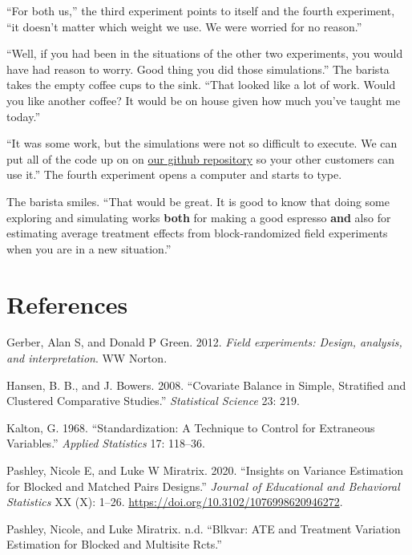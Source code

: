\documentclass[
]{article}
\newlength{\cslhangindent}
\newenvironment{cslreferences}%
  {\setlength{\parindent}{0pt}%
  \everypar{\setlength{\hangindent}{\cslhangindent}}\ignorespaces}%
  {\par}
\begin{document}
``For both us,'' the third experiment points to itself and the fourth experiment, ``it doesn't matter which weight we use. We were worried for no reason.''

``Well, if you had been in the situations of the other two experiments, you would have had reason to worry. Good thing you did those simulations.'' The barista takes the empty coffee cups to the sink. ``That looked like a lot of work. Would you like another coffee? It would be on house given how much you've taught me today.''

``It was some work, but the simulations were not so difficult to execute. We can put all of the code up on on \href{https://github.com/egap/standards_discussions/block_rand}{our github repository} so your other customers can use it.'' The fourth experiment opens a computer and starts to type.

The barista smiles. ``That would be great. It is good to know that doing some exploring and simulating works \textbf{both} for making a good espresso \textbf{and} also for estimating average treatment effects from block-randomized field experiments when you are in a new situation.''

\hypertarget{references}{%
\section*{References}\label{references}}

\hypertarget{refs}{}
\begin{cslreferences}
\leavevmode\hypertarget{ref-gerber2012field}{}%
Gerber, Alan S, and Donald P Green. 2012. \emph{Field experiments: Design, analysis, and interpretation}. WW Norton.

\leavevmode\hypertarget{ref-hansen2008cbs}{}%
Hansen, B. B., and J. Bowers. 2008. ``Covariate Balance in Simple, Stratified and Clustered Comparative Studies.'' \emph{Statistical Science} 23: 219.

\leavevmode\hypertarget{ref-kalton1968}{}%
Kalton, G. 1968. ``Standardization: A Technique to Control for Extraneous Variables.'' \emph{Applied Statistics} 17: 118--36.

\leavevmode\hypertarget{ref-pashley2020blocked}{}%
Pashley, Nicole E, and Luke W Miratrix. 2020. ``Insights on Variance Estimation for Blocked and Matched Pairs Designs.'' \emph{Journal of Educational and Behavioral Statistics} XX (X): 1--26. \url{https://doi.org/10.3102/1076998620946272}.

\leavevmode\hypertarget{ref-pashley2020blkvar}{}%
Pashley, Nicole, and Luke Miratrix. n.d. ``Blkvar: ATE and Treatment Variation Estimation for Blocked and Multisite Rcts.''
\end{cslreferences}
\end{document}
